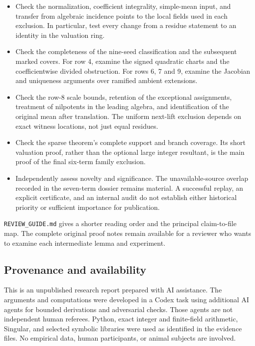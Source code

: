 \documentclass[
  british,
  10pt,
]{article}
\providecommand{\tightlist}{%
  \setlength{\itemsep}{0pt}\setlength{\parskip}{0pt}}
\begin{document}
\begin{itemize}
\tightlist
\item
  Check the normalization, coefficient integrality, simple-mean input,
  and transfer from algebraic incidence points to the local fields used
  in each exclusion. In particular, test every change from a residue
  statement to an identity in the valuation ring.
\item
  Check the completeness of the nine-seed classification and the
  subsequent marked covers. For row 4, examine the signed quadratic
  charts and the coefficientwise divided obstruction. For rows 6, 7 and
  9, examine the Jacobian and uniqueness arguments over ramified ambient
  extensions.
\item
  Check the row-8 scale bounds, retention of the exceptional
  assignments, treatment of nilpotents in the leading algebra, and
  identification of the original mean after translation. The uniform
  next-lift exclusion depends on exact witness locations, not just equal
  residues.
\item
  Check the sparse theorem's complete support and branch coverage. Its
  short valuation proof, rather than the optional large integer
  resultant, is the main proof of the final six-term family exclusion.
\item
  Independently assess novelty and significance. The unavailable-source
  overlap recorded in the seven-term dossier remains material. A
  successful replay, an explicit certificate, and an internal audit do
  not establish either historical priority or sufficient importance for
  publication.
\end{itemize}

\texttt{REVIEW\_GUIDE.md} gives a shorter reading order and the
principal claim-to-file map. The complete original proof notes remain
available for a reviewer who wants to examine each intermediate lemma
and experiment.

\subsection{Provenance and
availability}\label{provenance-and-availability}

This is an unpublished research report prepared with AI assistance. The
arguments and computations were developed in a Codex task using
additional AI agents for bounded derivations and adversarial checks.
Those agents are not independent human referees. Python, exact integer
and finite-field arithmetic, Singular, and selected symbolic libraries
were used as identified in the evidence files. No empirical data, human
participants, or animal subjects are involved.
\end{document}
